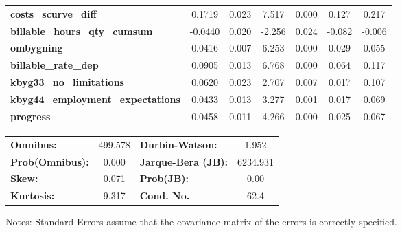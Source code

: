 \begin{center}
\begin{tabular}{lcccccc}
\textbf{costs\_scurve\_diff}              &       0.1719  &        0.023     &     7.517  &         0.000        &        0.127    &        0.217     \\
\textbf{billable\_hours\_qty\_cumsum}     &      -0.0440  &        0.020     &    -2.256  &         0.024        &       -0.082    &       -0.006     \\
\textbf{ombygning}                        &       0.0416  &        0.007     &     6.253  &         0.000        &        0.029    &        0.055     \\
\textbf{billable\_rate\_dep}              &       0.0905  &        0.013     &     6.768  &         0.000        &        0.064    &        0.117     \\
\textbf{kbyg33\_no\_limitations}          &       0.0620  &        0.023     &     2.707  &         0.007        &        0.017    &        0.107     \\
\textbf{kbyg44\_employment\_expectations} &       0.0433  &        0.013     &     3.277  &         0.001        &        0.017    &        0.069     \\
\textbf{progress}                         &       0.0458  &        0.011     &     4.266  &         0.000        &        0.025    &        0.067     \\
\bottomrule
\end{tabular}
\begin{tabular}{lclc}
\textbf{Omnibus:}       & 499.578 & \textbf{  Durbin-Watson:     } &    1.952  \\
\textbf{Prob(Omnibus):} &   0.000 & \textbf{  Jarque-Bera (JB):  } & 6234.931  \\
\textbf{Skew:}          &   0.071 & \textbf{  Prob(JB):          } &     0.00  \\
\textbf{Kurtosis:}      &   9.317 & \textbf{  Cond. No.          } &     62.4  \\
\bottomrule
\end{tabular}
\end{center}

Notes: \newline
 [1] Standard Errors assume that the covariance matrix of the errors is correctly specified.